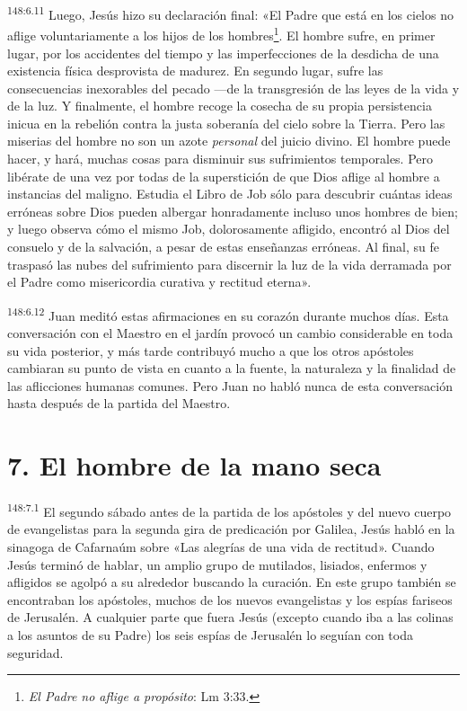 \par 
\textsuperscript{148:6.11} Luego, Jesús hizo su declaración final: «El Padre que está en los cielos no aflige voluntariamente a los hijos de los hombres\footnote{\textit{El Padre no aflige a propósito}: Lm 3:33.}. El hombre sufre, en primer lugar, por los accidentes del tiempo y las imperfecciones de la desdicha de una existencia física desprovista de madurez. En segundo lugar, sufre las consecuencias inexorables del pecado ---de la transgresión de las leyes de la vida y de la luz. Y finalmente, el hombre recoge la cosecha de su propia persistencia inicua en la rebelión contra la justa soberanía del cielo sobre la Tierra. Pero las miserias del hombre no son un azote \textit{personal} del juicio divino. El hombre puede hacer, y hará, muchas cosas para disminuir sus sufrimientos temporales. Pero libérate de una vez por todas de la superstición de que Dios aflige al hombre a instancias del maligno. Estudia el Libro de Job sólo para descubrir cuántas ideas erróneas sobre Dios pueden albergar honradamente incluso unos hombres de bien; y luego observa cómo el mismo Job, dolorosamente afligido, encontró al Dios del consuelo y de la salvación, a pesar de estas enseñanzas erróneas. Al final, su fe traspasó las nubes del sufrimiento para discernir la luz de la vida derramada por el Padre como misericordia curativa y rectitud eterna».

\par 
\textsuperscript{148:6.12} Juan meditó estas afirmaciones en su corazón durante muchos días. Esta conversación con el Maestro en el jardín provocó un cambio considerable en toda su vida posterior, y más tarde contribuyó mucho a que los otros apóstoles cambiaran su punto de vista en cuanto a la fuente, la naturaleza y la finalidad de las aflicciones humanas comunes. Pero Juan no habló nunca de esta conversación hasta después de la partida del Maestro.

\section*{7. El hombre de la mano seca}
\par 
\textsuperscript{148:7.1} El segundo sábado antes de la partida de los apóstoles y del nuevo cuerpo de evangelistas para la segunda gira de predicación por Galilea, Jesús habló en la sinagoga de Cafarnaúm sobre «Las alegrías de una vida de rectitud». Cuando Jesús terminó de hablar, un amplio grupo de mutilados, lisiados, enfermos y afligidos se agolpó a su alrededor buscando la curación. En este grupo también se encontraban los apóstoles, muchos de los nuevos evangelistas y los espías fariseos de Jerusalén. A cualquier parte que fuera Jesús (excepto cuando iba a las colinas a los asuntos de su Padre) los seis espías de Jerusalén lo seguían con toda seguridad.

